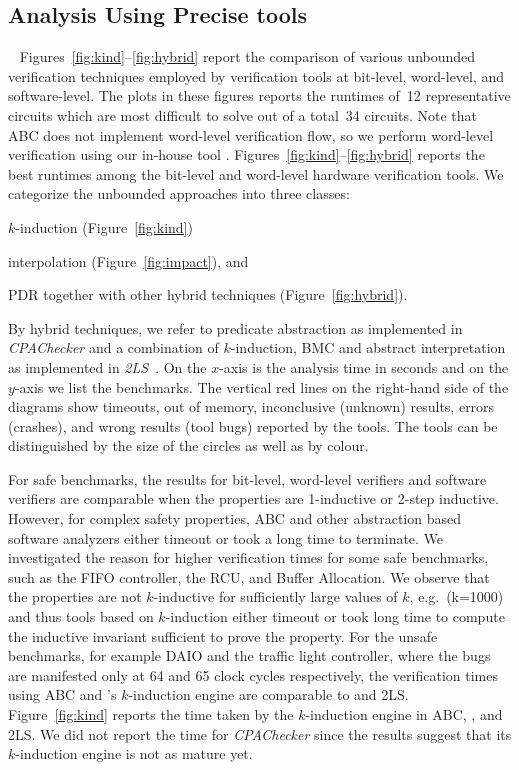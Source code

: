 \subsection{Analysis Using Precise tools}~\label{precise}
%
Figures~\ref{fig:kind}--\ref{fig:hybrid} report the comparison of various unbounded 
verification techniques employed by verification tools at bit-level, word-level, 
and software-level.  The plots in these figures reports the runtimes of~12 
representative circuits which are most difficult to solve out of a total~34 
circuits.  Note that ABC does not implement word-level verification flow, 
so we perform word-level verification using our in-house tool \ebmc.
Figures~\ref{fig:kind}--\ref{fig:hybrid} reports the best runtimes 
among the bit-level and word-level hardware verification tools.  
%
We categorize the unbounded approaches into three classes:
\begin{compactitem}
\item $k$-induction (Figure~\ref{fig:kind})
\item interpolation (Figure~\ref{fig:impact}), and 
\item PDR together with other hybrid techniques (Figure~\ref{fig:hybrid}).  
\end{compactitem}
By hybrid techniques, we refer to predicate
abstraction as implemented in \emph{CPAChecker} and a combination of
$k$-induction, BMC and abstract interpretation as implemented in
\emph{2LS}~\cite{kiki}.  On the $x$-axis is the analysis time in
seconds and on the $y$-axis we list the benchmarks. The vertical red lines on
the right-hand side of the diagrams show timeouts, out of memory,
inconclusive (unknown) results, errors (crashes), and wrong results
(tool bugs) reported by the tools. The tools can be distinguished 
by the size of the circles as well as by colour. 

 For safe benchmarks, the results
for bit-level, word-level verifiers and software verifiers are
comparable when the properties are 1-inductive or 2-step inductive.
However, for complex safety properties, ABC and other abstraction
based software analyzers either timeout or took a long time to
terminate.  We investigated the reason for higher verification times
for some safe benchmarks, such as the FIFO controller, the RCU, and Buffer 
Allocation.  We observe that the properties are not $k$-inductive for
sufficiently large values of $k$, e.g.\ (k=1000) and thus tools based
on $k$-induction either timeout or took long time to
compute the inductive invariant sufficient to prove the property. For
the unsafe benchmarks, for example DAIO and the traffic light controller, where
the bugs are manifested only at 64 and 65 clock cycles respectively,
the verification times using ABC and \ebmc's $k$-induction engine 
are comparable to \cbmcv and \textsc{2LS}. Figure~\ref{fig:kind} 
reports the time taken by the $k$-induction engine in 
ABC, \ebmcv, \cbmcv and \textsc{2LS}.  We did not report
the time for \emph{CPAChecker} since the results suggest that 
its $k$-induction engine is not as mature yet. 

